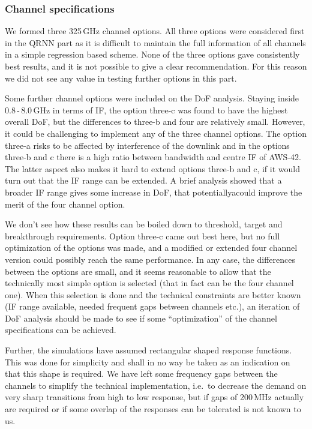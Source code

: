 \documentclass[12pt]{article}
\begin{document}
\subsubsection{Channel specifications}
%
We formed three 325\,GHz channel options. All three options were
considered first in the QRNN part as it is difficult to maintain the full
information of all channels in a simple regression based scheme. None of the
three options gave consistently best results, and it is not possible to give a
clear recommendation. For this reason we did not see any value in testing
further options in this part.

Some further channel options were included on the DoF analysis. Staying inside
0.8\,-\,8.0\,GHz in terms of IF, the option three-c was found to have the
highest overall DoF, but the differences to three-b and four are relatively
small. However, it could be challenging to implement any of the three channel
options. The option three-a risks to be affected by interference of the downlink
and in the options three-b and c there is a high ratio between bandwidth and centre IF of AWS-42. The latter aspect also makes it hard to extend options three-b and c, if it would turn out that the IF range can be extended. A brief analysis showed that a broader IF range gives some increase in DoF, that potentiallyacould improve the merit of the four channel option.

We don't see how these results can be boiled down to threshold, target and
breakthrough requirements. Option three-c came out best here, but no full
optimization of the options was made, and a modified or extended four channel
version could possibly reach the same performance. In any case, the differences
between the options are small, and it seems reasonable to allow that the
technically most simple option is selected (that in fact can be the four
channel one). When this selection is done and the technical constraints are
better known (IF range available, needed frequent gaps between channels etc.), an iteration of DoF analysis should be made to see if some ``optimization'' of the channel specifications can be achieved.

Further, the simulations have assumed rectangular shaped response functions.
This was done for simplicity and shall in no way be taken as an indication on
that this shape is required. We have left some frequency gaps between the
channels to simplify the technical implementation, i.e.\ to decrease the demand
on very sharp transitions from high to low response, but if gaps of 200\,MHz
actually are required or if some overlap of the responses can be tolerated is
not known to us.
\end{document}
